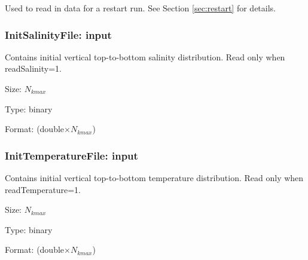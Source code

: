 Used to read in data for a restart run.  See Section \ref{sec:restart} for details.


\subsubsection{InitSalinityFile: input}

Contains initial vertical top-to-bottom salinity distribution.  Read only when readSalinity=1.
\begin{list}{}
\item Size: $N_{kmax}$
\item Type: binary
\item Format: (double$\times N_{kmax}$)
\end{list}


\subsubsection{InitTemperatureFile: input}

Contains initial vertical top-to-bottom temperature distribution.  Read only when \\readTemperature=1.
\begin{list}{}
\item Size: $N_{kmax}$
\item Type: binary
\item Format: (double$\times N_{kmax}$)
\end{list}
